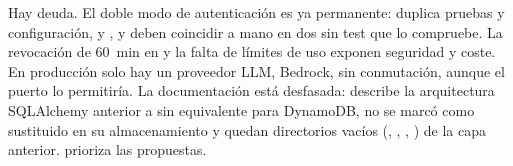 Hay deuda. El doble modo de autenticación es ya permanente: duplica pruebas y configuración, y
,  y  deben coincidir a mano en dos
 sin test que lo compruebe. La revocación de 60~min en  y la falta de
límites de uso exponen seguridad y coste. En producción solo hay un proveedor LLM,
Bedrock, sin conmutación, aunque el puerto  lo permitiría. La documentación está desfasada:  describe la arquitectura SQLAlchemy
anterior a  sin equivalente para DynamoDB,  no se marcó como sustituido en
su almacenamiento y quedan directorios vacíos (, ,
, ) de la capa anterior. 
prioriza las propuestas.
